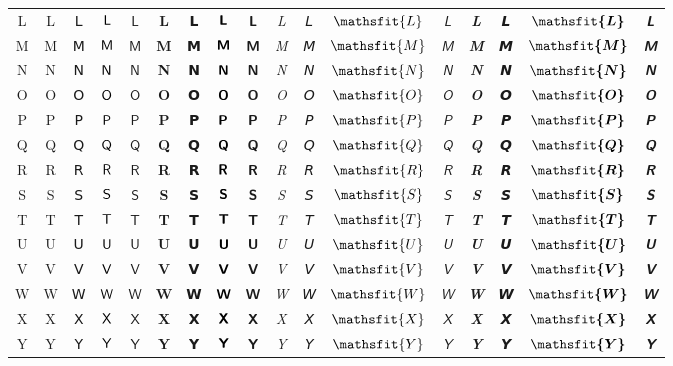 \documentclass{standalone}
\newcommand{\SANS}[1]{\ifmmode\mathsf{#1}\else\textsf{#1}\fi}
\newcommand{\BSANS}[1]{\ifmmode\boldsymbol{\mathsf{#1}}\else\textbf{\textsf{#1}}\fi}
\newcommand{\ISANS}[1]{\ifmmode\mathsfit{#1}\else\textit{\textsf{#1}}\fi}
\newcommand{\BISANS}[1]{\ifmmode\bm{\mathsfit{#1}}\else\textbf{\textsf{\textit{#1}}}\fi}
\begin{document}
\begin{tabular}{c|cc|cc|cc|cc|cc|cc|cc|cc}
L & \SANS{L} & 𝖫 & $\SANS{L}$ & $𝖫$ & \BSANS{L} & 𝗟 & $\BSANS{L}$ & $𝗟$ & \ISANS{L} & 𝘓 & $\ISANS{L}$ & $𝘓$ & \BISANS{L} & 𝙇 & $\BISANS{L}$ & $𝙇$  \\
M & \SANS{M} & 𝖬 & $\SANS{M}$ & $𝖬$ & \BSANS{M} & 𝗠 & $\BSANS{M}$ & $𝗠$ & \ISANS{M} & 𝘔 & $\ISANS{M}$ & $𝘔$ & \BISANS{M} & 𝙈 & $\BISANS{M}$ & $𝙈$  \\
N & \SANS{N} & 𝖭 & $\SANS{N}$ & $𝖭$ & \BSANS{N} & 𝗡 & $\BSANS{N}$ & $𝗡$ & \ISANS{N} & 𝘕 & $\ISANS{N}$ & $𝘕$ & \BISANS{N} & 𝙉 & $\BISANS{N}$ & $𝙉$  \\
O & \SANS{O} & 𝖮 & $\SANS{O}$ & $𝖮$ & \BSANS{O} & 𝗢 & $\BSANS{O}$ & $𝗢$ & \ISANS{O} & 𝘖 & $\ISANS{O}$ & $𝘖$ & \BISANS{O} & 𝙊 & $\BISANS{O}$ & $𝙊$  \\
P & \SANS{P} & 𝖯 & $\SANS{P}$ & $𝖯$ & \BSANS{P} & 𝗣 & $\BSANS{P}$ & $𝗣$ & \ISANS{P} & 𝘗 & $\ISANS{P}$ & $𝘗$ & \BISANS{P} & 𝙋 & $\BISANS{P}$ & $𝙋$  \\
Q & \SANS{Q} & 𝖰 & $\SANS{Q}$ & $𝖰$ & \BSANS{Q} & 𝗤 & $\BSANS{Q}$ & $𝗤$ & \ISANS{Q} & 𝘘 & $\ISANS{Q}$ & $𝘘$ & \BISANS{Q} & 𝙌 & $\BISANS{Q}$ & $𝙌$  \\
R & \SANS{R} & 𝖱 & $\SANS{R}$ & $𝖱$ & \BSANS{R} & 𝗥 & $\BSANS{R}$ & $𝗥$ & \ISANS{R} & 𝘙 & $\ISANS{R}$ & $𝘙$ & \BISANS{R} & 𝙍 & $\BISANS{R}$ & $𝙍$  \\
S & \SANS{S} & 𝖲 & $\SANS{S}$ & $𝖲$ & \BSANS{S} & 𝗦 & $\BSANS{S}$ & $𝗦$ & \ISANS{S} & 𝘚 & $\ISANS{S}$ & $𝘚$ & \BISANS{S} & 𝙎 & $\BISANS{S}$ & $𝙎$  \\
T & \SANS{T} & 𝖳 & $\SANS{T}$ & $𝖳$ & \BSANS{T} & 𝗧 & $\BSANS{T}$ & $𝗧$ & \ISANS{T} & 𝘛 & $\ISANS{T}$ & $𝘛$ & \BISANS{T} & 𝙏 & $\BISANS{T}$ & $𝙏$  \\
U & \SANS{U} & 𝖴 & $\SANS{U}$ & $𝖴$ & \BSANS{U} & 𝗨 & $\BSANS{U}$ & $𝗨$ & \ISANS{U} & 𝘜 & $\ISANS{U}$ & $𝘜$ & \BISANS{U} & 𝙐 & $\BISANS{U}$ & $𝙐$  \\
V & \SANS{V} & 𝖵 & $\SANS{V}$ & $𝖵$ & \BSANS{V} & 𝗩 & $\BSANS{V}$ & $𝗩$ & \ISANS{V} & 𝘝 & $\ISANS{V}$ & $𝘝$ & \BISANS{V} & 𝙑 & $\BISANS{V}$ & $𝙑$  \\
W & \SANS{W} & 𝖶 & $\SANS{W}$ & $𝖶$ & \BSANS{W} & 𝗪 & $\BSANS{W}$ & $𝗪$ & \ISANS{W} & 𝘞 & $\ISANS{W}$ & $𝘞$ & \BISANS{W} & 𝙒 & $\BISANS{W}$ & $𝙒$  \\
X & \SANS{X} & 𝖷 & $\SANS{X}$ & $𝖷$ & \BSANS{X} & 𝗫 & $\BSANS{X}$ & $𝗫$ & \ISANS{X} & 𝘟 & $\ISANS{X}$ & $𝘟$ & \BISANS{X} & 𝙓 & $\BISANS{X}$ & $𝙓$  \\
Y & \SANS{Y} & 𝖸 & $\SANS{Y}$ & $𝖸$ & \BSANS{Y} & 𝗬 & $\BSANS{Y}$ & $𝗬$ & \ISANS{Y} & 𝘠 & $\ISANS{Y}$ & $𝘠$ & \BISANS{Y} & 𝙔 & $\BISANS{Y}$ & $𝙔$  \\

\end{tabular}
\end{document}
